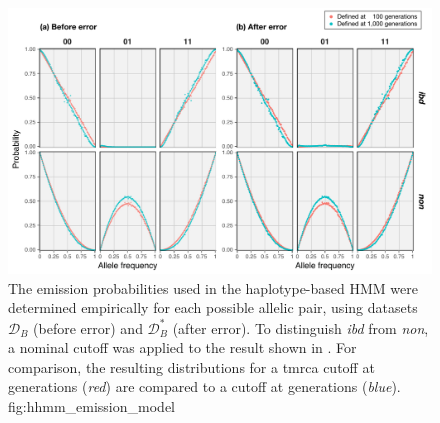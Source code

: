 

\begin{figure}[!htb]
\centering
\includegraphics[width=\textwidth]{./img/ch5/hhmm_emission_model_lowres}
{The emission probabilities used in the haplotype-based HMM were determined empirically for each possible allelic pair, using datasets $\mathcal{D}_B$ (before error) and $\mathcal{D}_B^{\ast}$ (after error).
To distinguish \emph{ibd} from \emph{non}, a nominal cutoff was applied to the result shown in .
For comparison, the resulting distributions for a \gls{tmrca} cutoff at  generations (\emph{red}) are compared to a cutoff at  generations (\emph{blue}).}
{fig:hhmm_emission_model}
\end{figure}

